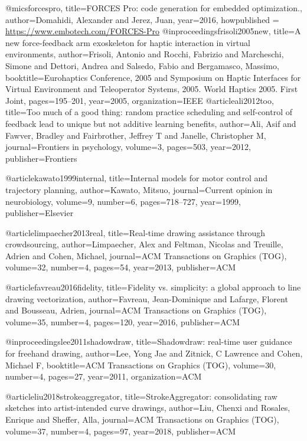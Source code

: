 @mics{forcespro,
title={FORCES Pro: code generation for embedded optimization.},
author={Domahidi, Alexander and Jerez, Juan},
year={2016},
howpublished = {\url{https://www.embotech.com/FORCES-Pro}}
}
@inproceedings{frisoli2005new,
  title={A new force-feedback arm exoskeleton for haptic interaction in virtual environments},
  author={Frisoli, Antonio and Rocchi, Fabrizio and Marcheschi, Simone and Dettori, Andrea and Salsedo, Fabio and Bergamasco, Massimo},
  booktitle={Eurohaptics Conference, 2005 and Symposium on Haptic Interfaces for Virtual Environment and Teleoperator Systems, 2005. World Haptics 2005. First Joint},
  pages={195--201},
  year={2005},
  organization={IEEE}
}
@article{ali2012too,
  title={Too much of a good thing: random practice scheduling and self-control of feedback lead to unique but not additive learning benefits},
  author={Ali, Asif and Fawver, Bradley and Fairbrother, Jeffrey T and Janelle, Christopher M},
  journal={Frontiers in psychology},
  volume={3},
  pages={503},
  year={2012},
  publisher={Frontiers}
}

@article{kawato1999internal,
  title={Internal models for motor control and trajectory planning},
  author={Kawato, Mitsuo},
  journal={Current opinion in neurobiology},
  volume={9},
  number={6},
  pages={718--727},
  year={1999},
  publisher={Elsevier}
}




@article{limpaecher2013real,
  title={Real-time drawing assistance through crowdsourcing},
  author={Limpaecher, Alex and Feltman, Nicolas and Treuille, Adrien and Cohen, Michael},
  journal={ACM Transactions on Graphics (TOG)},
  volume={32},
  number={4},
  pages={54},
  year={2013},
  publisher={ACM}
}

@article{favreau2016fidelity,
  title={Fidelity vs. simplicity: a global approach to line drawing vectorization},
  author={Favreau, Jean-Dominique and Lafarge, Florent and Bousseau, Adrien},
  journal={ACM Transactions on Graphics (TOG)},
  volume={35},
  number={4},
  pages={120},
  year={2016},
  publisher={ACM}
}

@inproceedings{lee2011shadowdraw,
  title={Shadowdraw: real-time user guidance for freehand drawing},
  author={Lee, Yong Jae and Zitnick, C Lawrence and Cohen, Michael F},
  booktitle={ACM Transactions on Graphics (TOG)},
  volume={30},
  number={4},
  pages={27},
  year={2011},
  organization={ACM}
}

@article{liu2018strokeaggregator,
  title={StrokeAggregator: consolidating raw sketches into artist-intended curve drawings},
  author={Liu, Chenxi and Rosales, Enrique and Sheffer, Alla},
  journal={ACM Transactions on Graphics (TOG)},
  volume={37},
  number={4},
  pages={97},
  year={2018},
  publisher={ACM}
}

